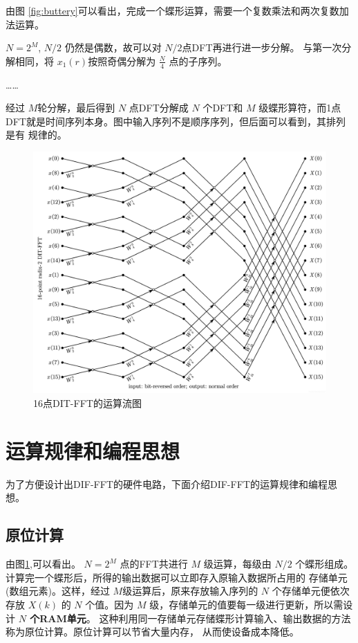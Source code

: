     由图 \ref{fig:buttery}可以看出，完成一个蝶形运算，需要一个复数乘法和两次复数加法运算。

$N=2^M$, $N/2$ 仍然是偶数，故可以对 $N /2$点DFT再进行进一步分解。
与第一次分解相同，将 $x_1(r)$按照奇偶分解为 $\frac{N}{4}$ 点的子序列。

……

经过 $M$轮分解，最后得到 $N$ 点DFT分解成 $N$ 个DFT和 $M$ 级蝶形算符，而1点
DFT就是时间序列本身。图中输入序列不是顺序序列，但后面可以看到，其排列是有
规律的。
\begin{figure}[H]
    \centering
        \includegraphics[width=0.8\linewidth]{Figure/dataflow.png}
    \caption{16点DIT-FFT的运算流图}%
    \label{fig:Figure/dataflow}
\end{figure}

\section{运算规律和编程思想}%


为了方便设计出DIF-FFT的硬件电路，下面介绍DIF-FFT的运算规律和编程思想。

\subsection{原位计算}%
\label{sub:yuan_wei_ji_suan_}



由图\ref{fig:Figure/dataflow},可以看出。 $N=2^M$ 点的FFT共进行 $M$ 级运算，每级由
$N /2$ 个蝶形组成。计算完一个蝶形后，所得的输出数据可以立即存入原输入数据所占用的
存储单元(数组元素)。这样，经过 $M$级运算后，原来存放输入序列的 $N$ 个存储单元便依次
存放 $X(k)$ 的 $N$ 个值。因为 $M$ 级，存储单元的值要每一级进行更新，所以需设计 \textbf{$N$ 个RAM单元}。
这种利用同一存储单元存储蝶形计算输入、输出数据的方法称为原位计算。原位计算可以节省大量内存，
从而使设备成本降低。
\label{ssub:yuan_wei_ji_suan_}


